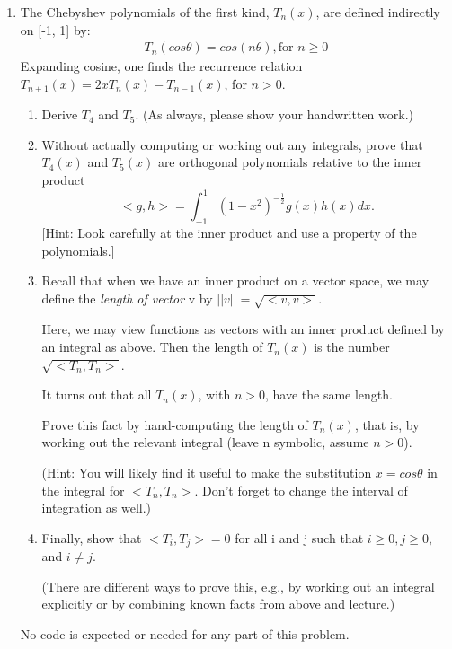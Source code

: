 \documentclass[conference,onecolumn]{IEEEtran}
\begin{document}
\begin{enumerate}[label=\arabic{enumi}.]
            \clearpage
      \item The Chebyshev polynomials of the first kind, $T_n(x)$, are defined indirectly on [-1, 1] by:
            \begin{align*}
                  T_n(cos \theta) = cos(n \theta), \text{for } n \geq 0
            \end{align*}
            Expanding cosine, one finds the recurrence relation $T_{n+1}(x) = 2xT_n(x)-T_{n-1}(x)$, for $n > 0$.
            \begin{enumerate}
                  \item Derive $T_4$ and $T_5$. (As always, please show your handwritten work.)
                  \item Without actually computing or working out any integrals, prove that $T_4(x)$ and $T_5(x)$ are orthogonal polynomials relative to the inner product
                        $$
                              < g, h > = \int_{-1}^{1} (1 - x^2)^{-\frac{1}{2}}g(x)h(x)dx.
                        $$
                        [Hint: Look carefully at the inner product and use a property of the polynomials.]
                  \item Recall that when we have an inner product on a vector space, we may define the \textit{length of vector} v by $||v|| = \sqrt{< v, v >}$.

                        Here, we may view functions as vectors with an inner product defined by an integral
                        as above.
                        Then the length of $T_n(x)$ is the number $\sqrt{< T_n, T_n >}$.

                        It turns out that all $T_n(x)$, with $n > 0$, have the same length.

                        Prove this fact by hand-computing the length of $T_n(x)$, that is, by working out the relevant integral (leave n symbolic, assume $n > 0$).

                        (Hint: You will likely find it useful to make the substitution $x = cos \theta$ in the integral for $< T_n, T_n >$. Don't forget to change the interval of integration as well.)
                  \item Finally, show that $< T_i, T_j > = 0$ for all i and j such that $i \geq 0, j \geq 0$, and $i \neq j$.

                        (There are different ways to prove this, e.g., by working out an integral explicitly or by combining known facts from above and lecture.)
            \end{enumerate}
            No code is expected or needed for any part of this problem.


\end{enumerate}
\end{document}
